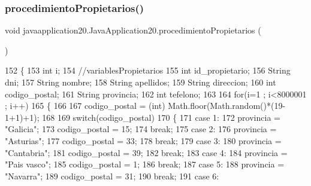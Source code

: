 \subsubsection{\texorpdfstring{procedimiento\+Propietarios()}{procedimientoPropietarios()}}
{\footnotesize\ttfamily void javaapplication20.\+Java\+Application20.\+procedimiento\+Propietarios (\begin{DoxyParamCaption}{ }\end{DoxyParamCaption})\hspace{0.3cm}{\ttfamily [inline]}}


\begin{DoxyCode}
152     \{
153             \textcolor{keywordtype}{int} i;
154             \textcolor{comment}{//variablesPropietarios}
155             \textcolor{keywordtype}{int} id\_propietario;
156             String dni;
157             String nombre;
158             String apellidos;
159             String direccion;
160             \textcolor{keywordtype}{int} codigo\_postal;
161             String provincia;
162             \textcolor{keywordtype}{int} tefelono;
163             
164             \textcolor{keywordflow}{for}(i=1 ; i<8000001 ; i++)
165             \{
166             
167             codigo\_postal =  (int) Math.floor(Math.random()*(19-1+1)+1);    
168             
169             \textcolor{keywordflow}{switch}(codigo\_postal)
170             \{
171                     \textcolor{keywordflow}{case} 1:
172                     provincia = \textcolor{stringliteral}{"Galicia"};
173                     codigo\_postal = 15;
174                     \textcolor{keywordflow}{break};
175                     \textcolor{keywordflow}{case} 2:
176                     provincia = \textcolor{stringliteral}{"Asturias"};
177                     codigo\_postal = 33;
178                     \textcolor{keywordflow}{break};
179                     \textcolor{keywordflow}{case} 3:
180                     provincia = \textcolor{stringliteral}{"Cantabria"};
181                     codigo\_postal = 39;
182                     \textcolor{keywordflow}{break};
183                     \textcolor{keywordflow}{case} 4:
184                     provincia = \textcolor{stringliteral}{"Pais vasco"};
185                     codigo\_postal = 1;
186                     \textcolor{keywordflow}{break};
187                     \textcolor{keywordflow}{case} 5:
188                     provincia = \textcolor{stringliteral}{"Navarra"};
189                     codigo\_postal = 31;
190                     \textcolor{keywordflow}{break};
191                     \textcolor{keywordflow}{case} 6:

\end{DoxyCode}
